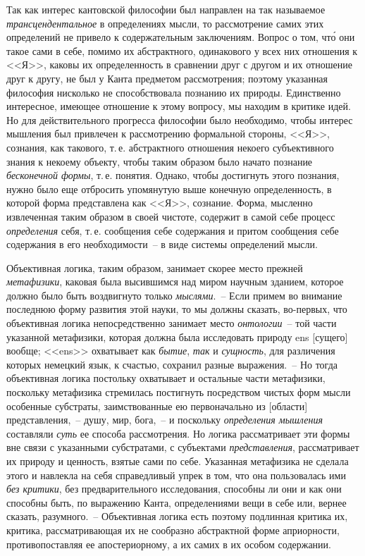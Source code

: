 Так как интерес кантовской философии был направлен
на так называемое \emph{трансцендентальное} в определениях
мысли, то рассмотрение самих этих определений не
привело к содержательным заключениям. Вопрос о том,
чт\'о они такое сами в себе, помимо их абстрактного, одинакового
у всех них отношения к <<Я>>, каковы их определенность
в сравнении друг с другом и их отношение
друг к другу, не был у Канта предметом рассмотрения;
поэтому указанная философия нисколько не способствовала
познанию их природы. Единственно интересное,
имеющее отношение к этому вопросу, мы находим в критике
идей. Но для действительного прогресса философии
было необходимо, чтобы интерес мышления был привлечен
к рассмотрению формальной стороны, <<Я>>, сознания,
как такового, т.\,е. абстрактного отношения некоего субъективного
знания к некоему объекту, чтобы таким образом
было начато познание \emph{бесконечной формы}, т.\,е. понятия.
Однако, чтобы достигнуть этого познания, нужно
было еще отбросить упомянутую выше конечную определенность,
в которой форма представлена как <<Я>>, сознание.
Форма, мысленно извлеченная таким образом
в своей чистоте, содержит в самой себе процесс \emph{определения}
себя, т.\,е. сообщения себе содержания и притом сообщения
себе содержания в его необходимости~-- в виде
системы определений мысли.

Объективная логика, таким образом, занимает скорее
место прежней \emph{метафизики}, каковая была высившимся
над миром научным зданием, которое должно было быть
воздвигнуто только \emph{мыслями}.~-- Если примем во внимание
последнюю форму развития этой науки\endnotemark{}, то мы
должны сказать, во-первых, что объективная логика непосредственно
занимает место \emph{онтологии}~-- той части указанной
метафизики, которая должна была исследовать
природу ens [сущего] вообще; <<ens>> охватывает как \emph{бытие},
\emph{так} и \emph{сущность}, для различения которых немецкий
язык, к счастью, сохранил разные выражения.~-- Но тогда
объективная логика постольку охватывает и остальные
части метафизики, поскольку метафизика стремилась
постигнуть посредством чистых форм мысли особенные
субстраты, заимствованные ею первоначально из [области]
представления,~-- душу, мир, бога,~-- и поскольку
\emph{определения мышления} составляли \emph{суть} ее способа рассмотрения.
Но логика рассматривает эти формы вне связи
с указанными субстратами, с субъектами \emph{представления},
рассматривает их природу и ценность, взятые
сами по себе. Указанная метафизика не сделала этого
и навлекла на себя справедливый упрек в том, что она
пользовалась ими \emph{без критики}, без предварительного исследования,
способны ли они и как они способны быть,
по выражению Канта, определениями вещи в себе или,
вернее сказать, разумного.~-- Объективная логика есть
поэтому подлинная критика их, критика, рассматривающая
их не сообразно абстрактной форме априорности,
противопоставляя ее апостериорному, а их самих в их
особом содержании.

